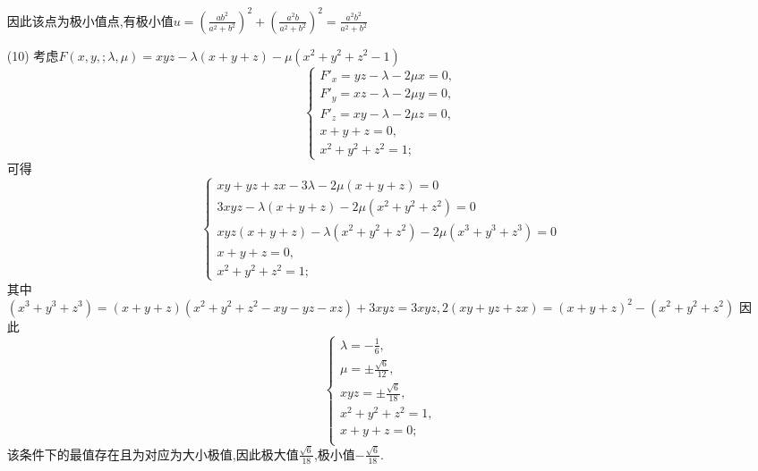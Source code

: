 \begin{solution}
\begin{enumerate}
        因此该点为极小值点,有极小值$u=\left(\frac{ab^2}{a^2+b^2}\right)^2+\left(\frac{a^2b}{a^2+b^2}\right)^2=\frac{a^2b^2}{a^2+b^2}$
        \item[(10)] 考虑$F(x,y,;\lambda,\mu)=xyz-\lambda\left(x+y+z\right)-\mu(x^2+y^2+z^2-1)$
        $$\begin{cases}
            F'_x=yz-\lambda-2\mu x=0,\\
            F'_y=xz-\lambda-2\mu y=0,\\
            F'_z=xy-\lambda-2\mu z=0,\\
            x+y+z=0,\\
            x^2+y^2+z^2=1;
        \end{cases}$$
        可得$$\begin{cases}
            xy+yz+zx-3\lambda -2\mu (x+y+z)=0\\
            3xyz-\lambda (x+y+z)-2\mu (x^2+y^2+z^2)=0\\
            xyz(x+y+z)-\lambda (x^2+y^2+z^2)-2\mu (x^3+y^3+z^3)=0\\
            x+y+z=0,\\
            x^2+y^2+z^2=1;
        \end{cases}$$
        其中$(x^3+y^3+z^3)=(x+y+z)(x^2+y^2+z^2-xy-yz-xz)+3xyz=3xyz,2(xy+yz+zx)=(x+y+z)^2-(x^2+y^2+z^2)$
        因此$$\begin{cases}
            \lambda=-\frac{1}{6},\\
            \mu=\pm\frac{\sqrt{6}}{12},\\
            xyz=\pm\frac{\sqrt{6}}{18},\\
            x^2+y^2+z^2=1,\\
            x+y+z=0;\\
        \end{cases}$$
        该条件下的最值存在且为对应为大小极值,因此极大值$\frac{\sqrt{6}}{18}$,极小值$-\frac{\sqrt{6}}{18}$.
    \end{enumerate}
\end{solution}

